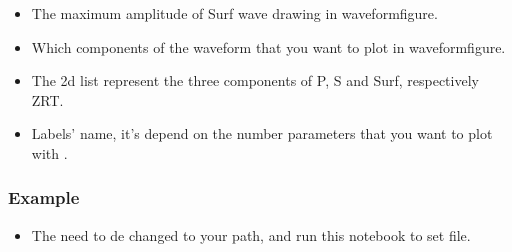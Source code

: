 \documentclass[a4paper,10pt,english,openany]{sphinxmanual}
\begin{document}
\begin{itemize}
\item {} 
The maximum amplitude of Surf wave drawing in waveform\sphinxhyphen{}figure.

\end{itemize}

\begin{itemize}
\item {} 
Which components of the waveform that you want to plot in waveform\sphinxhyphen{}figure.

\item {} 
The 2\sphinxhyphen{}d list represent the three components of P, S and Surf, respectively ZRT.

\end{itemize}

\begin{itemize}
\item {} 
Labels’ name, it’s depend on the number parameters that you want to plot with .

\end{itemize}


\subsubsection{Example}
\label{\detokenize{tutorials/S5_Plot_Result:example}}\begin{itemize}
\item {} 
The  need to de changed to your path, and run this notebook to set  file.

\end{itemize}
\end{document}
